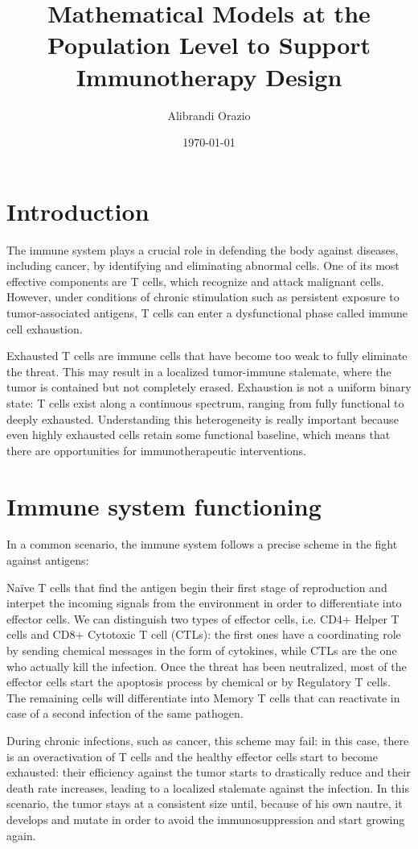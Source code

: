 \documentclass[12pt,a4paper]{article}
\title{Mathematical Models at the Population Level to Support Immunotherapy Design}
\author{Alibrandi Orazio}
\date{\today}
\begin{document}
\maketitle

\section{Introduction}
The immune system plays a crucial role in defending the body against diseases, including cancer, by identifying and eliminating abnormal cells. One of its most effective components are T cells, which recognize and attack malignant cells. However, under conditions of chronic stimulation such as persistent exposure to tumor-associated antigens, T cells can enter a dysfunctional phase called immune cell exhaustion. 

Exhausted T cells are immune cells that have become too weak to fully eliminate the threat. This may result in a localized tumor-immune stalemate, where the tumor is contained but not completely erased. Exhaustion is not a uniform binary state: T cells exist along a continuous spectrum, ranging from fully functional to deeply exhausted. Understanding this heterogeneity is really important because even highly exhausted cells retain some functional baseline, which means that there are opportunities for immunotherapeutic interventions.
\section{Immune system functioning}
In a common scenario, the immune system follows a precise scheme in the fight against antigens: 

Naïve T cells that find the antigen begin their first stage of reproduction and interpet the incoming signals from the environment in order to differentiate into effector cells. We can distinguish two types of effector cells, i.e. CD4+ Helper T cells and CD8+ Cytotoxic T cell (CTLs): the first ones have a coordinating role by sending chemical messages in the form of cytokines, while CTLs are the one who actually kill the infection. Once the threat has been neutralized, most of the effector cells start the apoptosis process by chemical or by Regulatory T cells. The remaining cells will differentiate into Memory T cells that can reactivate in case of a second infection of the same pathogen.

During chronic infections, such as cancer, this scheme may fail: in this case, there is an overactivation of T cells and the healthy effector cells start to become exhausted: their efficiency against the tumor starts to drastically reduce and their death rate increases, leading to a localized stalemate against the infection. In this scenario, the tumor stays at a consistent size until, because of his own nautre, it develops and mutate in order to avoid the immunosuppression and start growing again.
\end{document}
